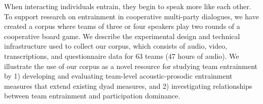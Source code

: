 When interacting individuals entrain, they begin to speak more like each other. To support research on entrainment in cooperative multi-party dialogues, we have created a corpus where teams of three or four speakers play two rounds of a cooperative board game. We describe the experimental design and technical infrastructure used to collect our corpus, which consists of audio, video, transcriptions, and questionnaire data for 63 teams (47 hours of audio). We illustrate the use of our corpus as a novel resource for studying team entrainment by 1)  developing and evaluating team-level acoustic-prosodic entrainment measures that extend existing dyad measures, and 2) investigating relationships between team entrainment and participation dominance.
